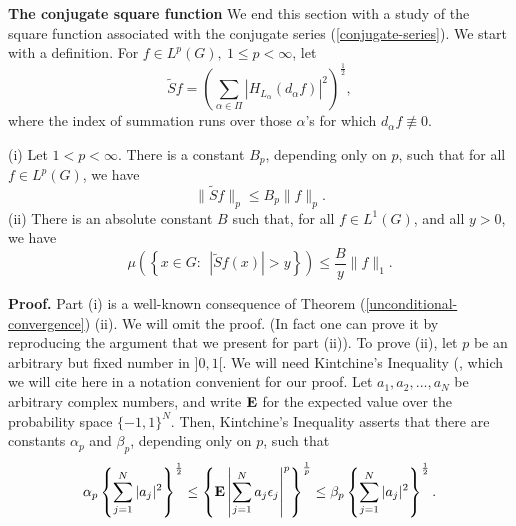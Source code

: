 {\bf The conjugate square function}  We end this section 
with a study of the square function
associated with the conjugate series (\ref{conjugate-series}).
We start with a definition.  For
$f\in L^p(G), \ 1\leq p<\infty$, let
\begin{equation}
\widetilde{S} f =\left( \sum_{\alpha\in \Pi} 
| H_{L_\alpha} ( d_\alpha f )|^2
\right)^\frac{1}{2},
\label{square-function}
\end{equation} 
 where the index of
 summation runs over those
 $\alpha$'s for which $d_\alpha f\not\equiv 0$.
\begin{theorem-square-function}
(i)  Let $1<p<\infty$.  There is a constant 
$B_p$, depending only on $p$, such that
for all $f\in L^p(G)$, we have
$$\| \widetilde{S} f \|_p\leq B_p \| f \|_p.$$
(ii)  There is an absolute constant $B$ such 
that, for all $f\in L^1(G)$, and all $y>0$,
we have
$$ \mu \left( \left\{ x\in G: \ \ | \widetilde{S} f (x) |
> y  \right\} \right) \leq \frac{B}{y} \| f \|_1 .
$$ 
\label{theorem-square-function}
\end{theorem-square-function}
{\bf Proof.}  Part (i) is a well-known consequence
of Theorem (\ref{unconditional-convergence}) (ii).  
We will omit the proof.  (In fact one can 
prove it by reproducing the argument that 
we present for part (ii)).  
To prove (ii), let $p$ be an arbitrary but 
fixed number in $]0,1[$.  We will need Kintchine's 
Inequality (\cite[Theorem V. 8.4, p.213]{zyg},
which we will cite here in a notation
convenient for our proof.  Let 
$a_1 , a_2,\ldots , a_N$ be arbitrary 
complex numbers, and write $\E$ for the
expected value over the probability space
$\{-1,1\}^N$.  Then,
Kintchine's Inequality asserts that there are
constants $\alpha_p$ and $\beta_p$, 
depending only on $p$, such that
\begin{equation}
\alpha_p \left\{ \sum_{j=1}^N |a_j |^2
\right\}^\frac{1}{2}
\leq
\left\{  \E \left| \sum_{j=1}^N a_j \e_j \right|^p
\right\}^\frac{1}{p}
\leq
\beta_p \left\{ \sum_{j=1}^N |a_j |^2
\right\}^\frac{1}{2}.
\label{kintchine-inequality}
\end{equation}
